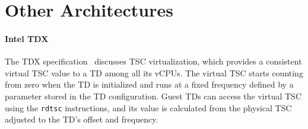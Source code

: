 \documentclass[sigplan,10pt]{acmart}
\newcommand{\inst}[1]{\texttt{\lowercase{#1}}}
\begin{document}

\section{Other Architectures}
\paragraph{Intel TDX}

The TDX specification~\cite{intelTdxSpec} discusses \ac{TSC} virtualization,
which provides a consistent virtual \ac{TSC} value to a \ac{TD} among all its
vCPUs. The virtual \ac{TSC} starts counting from zero when the \ac{TD} is
initialized and runs at a fixed frequency defined by a parameter stored in the
TD configuration. Guest \acp{TD} can access the virtual \ac{TSC} using the
\inst{RDTSC} instructions, and its value is calculated from the physical
\ac{TSC} adjusted to the \ac{TD}'s offset and frequency. 
\end{document}
